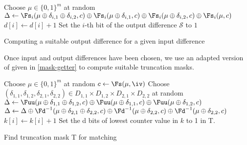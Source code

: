   \begin{algorithm}[ht]
        \LinesNumbered
    {
      Choose $\mu \in \{0,1\}^m$ at random\;
      $\Delta \leftarrow \Fs_i (\mu \oplus \delta_{i,1} \oplus \delta_{i,2} , c) \oplus \Fs_i (\mu \oplus \delta_{i,1} , c) \oplus
      \Fs_i(\mu \oplus \delta_{i,2},c) \oplus \Fs_i (\mu,c)$\;
      {
        {
          $d[i] \leftarrow d[i] + 1$\;
        }
      }
    }
    {
      {
        Set the $i$-th bit of the output difference $\mathcal{S}$ to $1$\;
      }
    }
    \caption{\label{difference-getter}Computing a suitable output difference for a given input difference}
  \end{algorithm}

  Once input and output differences have been chosen, we use an adapted version of \cite[Algorithm~2]{DBLP:conf/crypto/KnellwolfK12} given in
  \autoref{mask-getter} to compute suitable truncation masks. 

  \begin{algorithm}[ht]
        \LinesNumbered

    {
      Choose $\mu \in \{0,1\}^m$ at random \;
      $c \leftarrow \Fs(\mu, \iv)$\;
      Choose $(\delta_{1,1},\delta_{1,2},\delta_{2,1},\delta_{2,2}) \in D_{1,1} \times D_{1,2} \times D_{2,1} \times D_{2,2} $ at random\; 
      $\Delta \leftarrow 
      \Fuu (\mu \oplus \delta_{1,1} \oplus \delta_{1,2} , c) \oplus 
      \Fuu (\mu \oplus \delta_{1,1} , c) \oplus 
      \Fuu(\mu \oplus \delta_{1,2},c)$\;
      $\Delta \leftarrow \Delta \oplus
      \Fd^{-1} (\mu \oplus \delta_{2,1} \oplus \delta_{2,2}, c) \oplus 
      \Fd^{-1}(\mu \oplus \delta_{2,2} , c) \oplus 
      \Fd^{-1} (\mu \oplus \delta_{2,2} , c) $\;
      {
        {
          $k[i] \leftarrow k[i] + 1$\;
        }
      }
    }
    Set the d bits of lowest counter value in $k$ to 1 in T.
    \caption{\label{mask-getter}Find truncation mask T for matching}
  \end{algorithm}

